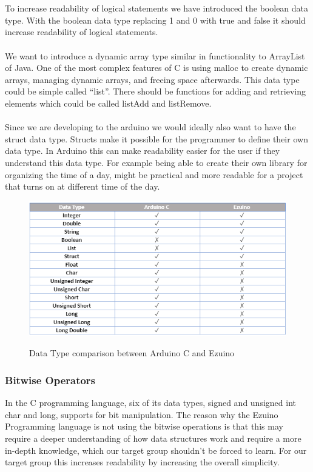 \\\\
To increase readability of logical statements we have introduced the boolean data type. With the boolean data type replacing 1 and 0 with true and false it should increase readability of logical statements.
\\ \\
We want to introduce a dynamic array type similar in functionality to ArrayList of Java. One of the most complex features of C is using malloc to create dynamic arrays, managing dynamic arrays, and freeing space afterwards. This data type could be simple called “list”. There should be functions for adding and retrieving elements which could be called listAdd and listRemove.
\\ \\
Since we are developing to the arduino we would ideally also want to have the struct data type. Structs make it possible for the programmer to define their own data type. In Arduino this can make readability easier for the user if they understand this data type. For example being able to create their own library for organizing the time of a day, might be practical and more readable for a project that turns on at different time of the day.  
\begin{figure}[H]
\centering
\caption{Data Type comparison between Arduino C and Ezuino}
\includegraphics[scale=0.85]{figures/language_features/langf01.png}
\label{lf01}
\end{figure}
\subsubsection*{Bitwise Operators}
In the C programming language, six of its data types, signed and unsigned int char and long, supports for bit manipulation. %
The reason why the Ezuino Programming language is not using the bitwise operations is that this may require a deeper understanding of how data structures work and require a more in-depth knowledge, which our target group shouldn’t be forced to learn. For our target group this increases readability by increasing the overall simplicity.
